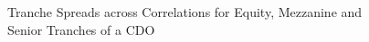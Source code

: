 \begin{figure}
{}
{}
\caption{\label{fig:tranchespreads}Tranche Spreads across Correlations for Equity, Mezzanine and Senior Tranches of a CDO}
\end{figure}

